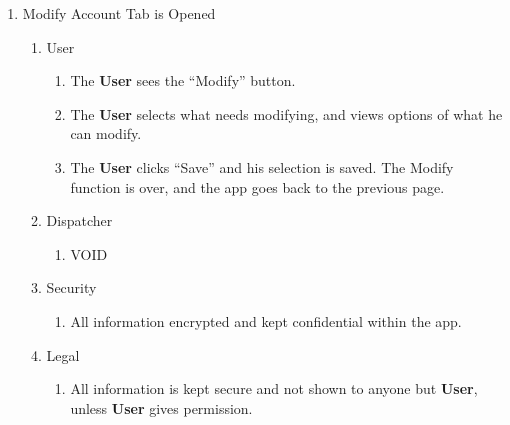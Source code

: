 \documentclass[english]{article}
\begin{document}
\begin{enumerate}[{BE}1.]
	\item Modify Account Tab is Opened	
	\begin{enumerate}[{VP4}.1]
		\item User
			\begin{enumerate}
				\item The \textbf{User} sees the “Modify” button.
				\item The \textbf{User} selects what needs modifying, and views options of what he can modify.
				\item The \textbf{User} clicks “Save” and his selection is saved. The Modify function is over, and the app goes back to the previous page.
			\end{enumerate}
		\item Dispatcher
			\begin{enumerate}
				\item VOID
			\end{enumerate}
		\item Security
			\begin{enumerate}
				\item All information encrypted and kept confidential within the app.
			\end{enumerate}
		\item Legal
			\begin{enumerate}
				\item All information is kept secure and not shown to anyone but \textbf{User}, unless \textbf{User} gives permission.
			\end{enumerate}
	\end{enumerate}


\end{enumerate}
\end{document}
